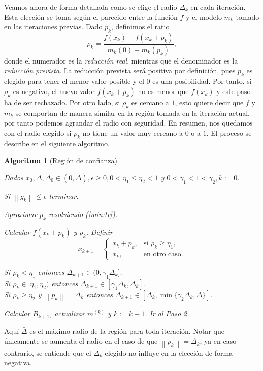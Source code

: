 \documentclass[11pt,a4paper]{book}
\newtheorem{algorithm}[theorem]{Algoritmo}
\theoremstyle{definition}
\theoremstyle{remark}
\newcommand{\norm}[1]{\left\lVert#1\right\rVert}
\begin{document}
Veamos ahora de forma detallada como se elige el radio $\Delta_k$ en cada iteración. Esta elección se toma según el parecido entre la función $f$ y el modelo $m_k$ tomado en las iteraciones previas. Dado $p_k$, definimos el ratio
\begin{equation}
\label{eq:rho_k}
	\rho_k = \frac{f(x_k)-f(x_k+p_k)}{m_k(0)-m_k(p_k)},
\end{equation}
donde el numerador es la \textit{reducción real}, mientras que el denominador es la \textit{reducción prevista}.
La reducción prevista será positiva por definición, pues $p_k$ es elegido para tener el menor valor posible y el $0$ es una posibilidad.
Por tanto, si $\rho_k$ es negativo, el nuevo valor $f(x_k+p_k)$ no es menor que $f(x_k)$ y este paso ha de ser rechazado.
Por otro lado, si $\rho_k$ es cercano a $1$, esto quiere decir que $f$ y $m_k$ se comportan de manera similar en la región tomada en la iteración actual, por tanto podemos agrandar el radio con seguridad.
En resumen, nos quedamos con el radio elegido si $\rho_k$ no tiene un valor muy cercano a $0$ o a $1$.
El proceso se describe en el siguiente algoritmo.
\begin{algorithm}[Región de confianza] \leavevmode
	\label{al:tr-lm}
	\begin{steps}
		\item Dados $x_0, \bar{\Delta}, \Delta_0 \in (0, \bar{\Delta}), \epsilon \geq
			0, 0<\eta_1\leq\eta_2<1$ y $0<\gamma_1<1<\gamma_2, k:=0$.
		\item Si $\norm{g_k} \leq \epsilon$ terminar.
		\item Aproximar $p_k$ resolviendo (\ref{min:tr}).
		\item Calcular $f(x_k+p_k)$ y $\rho_k$. Definir
			\begin{equation*}
				x_{k+1} = \begin{cases}
					x_k + p_k, & \text{si } \rho_k \geq \eta_1, \\
					x_k, & \text{en otro caso.}
				\end{cases}
			\end{equation*}
		\item Si $\rho_k < \eta_1$ entonces $\Delta_{k+1} \in (0,\gamma_1 \Delta_k]$. \\
			Si $\rho_k \in [\eta_1, \eta_2)$ entonces $\Delta_{k+1} \in [\gamma_1 \Delta_k,\Delta_k]$. \\
			Si $\rho_k \geq \eta_2$ y $\norm{p_k}=\Delta_k$ entonces
			$\Delta_{k+1} \in [\Delta_k, \min \{\gamma_2 \Delta_k,\bar{\Delta}\}]$.
		\item Calcular $B_{k+1}$, actualizar $m^{(k)}$ y $k:=k+1$. Ir al Paso 2.
	\end{steps}
\end{algorithm}
Aquí $\bar \Delta$ es el máximo radio de la región para toda iteración.
Notar que únicamente se aumenta el radio en el caso de que $\norm{p_k} = \Delta_k$,
ya en caso contrario, se entiende que el $\Delta_k$ elegido no influye en la elección
de forma negativa. %
\end{document}
